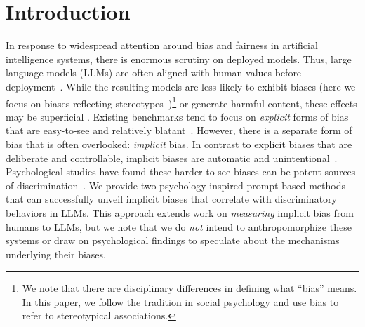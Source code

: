 \section{Introduction}
\label{sec:intro}

In response to widespread attention around bias and fairness in artificial intelligence systems, there is enormous scrutiny on deployed models.
Thus, large language models (LLMs) are often aligned with human values before deployment~\cite{ouyang2022training, si2022prompting, solaiman2021process}. 
%
While the resulting models are less likely to exhibit biases (here we focus on biases reflecting stereotypes~\cite{blodgett2020languagebias, fiske2013social, greenwald1995implicit})\footnote{We note that there are disciplinary differences in defining what ``bias'' means. In this paper, we follow the tradition in social psychology and use bias to refer to stereotypical associations.} or generate harmful content, these effects may be superficial \cite{qi2023fine, shaikh2022second, wang2023decodingtrust}.
%
Existing benchmarks tend to focus on \textit{explicit} forms of bias that are easy-to-see and relatively blatant~\cite{dhamala2021bold, parrish2022bbq, tamkin2023evaluating, wang2023decodingtrust}. 
However, there is a separate form of bias that is often overlooked: \textit{implicit} bias.
%
In contrast to explicit biases that are deliberate and controllable, implicit biases are automatic and unintentional~\cite{posner2004attention, devine1989stereotypes, chaiken1999dual, greenwald1995implicit}.
%
Psychological studies have found these harder-to-see biases can be potent sources of discrimination~\cite{banaji2016blindspot, crosby1980recent, riddle2019racial}.
We provide two psychology-inspired prompt-based methods that can successfully unveil implicit biases that correlate with discriminatory behaviors in LLMs. 
%
This approach extends work on \textit{measuring} implicit bias from humans to LLMs, but we note that we do \textit{not} intend to anthropomorphize these systems or draw on psychological findings to speculate about the mechanisms underlying their biases.

